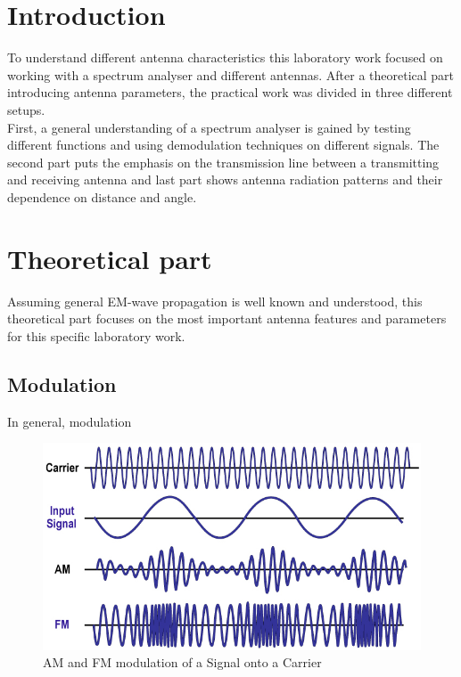 \section{Introduction}
To understand different antenna characteristics this laboratory work focused on working with a spectrum analyser and different antennas. After a theoretical part introducing antenna parameters, the practical work was divided in three different setups.\\
First, a general understanding of a spectrum analyser is gained by testing different functions and using demodulation techniques on different signals. The second part puts the emphasis on the transmission line between a transmitting and receiving antenna and last part shows antenna radiation patterns and their dependence on distance and angle.


\section{Theoretical part}
\label{sec:theory}
Assuming general EM-wave propagation is well known and understood, this theoretical part focuses on the most important antenna features and parameters for this specific laboratory work.

\subsection{Modulation}
In general, modulation
\begin{figure}[h!]
	\centering
	\includegraphics[width=\textwidth/2 + 3em]{images/modulation.jpg}
	\caption{AM and FM modulation of a Signal onto a Carrier {\protect\footnotemark}}
	\label{fig:mod}
\end{figure}

